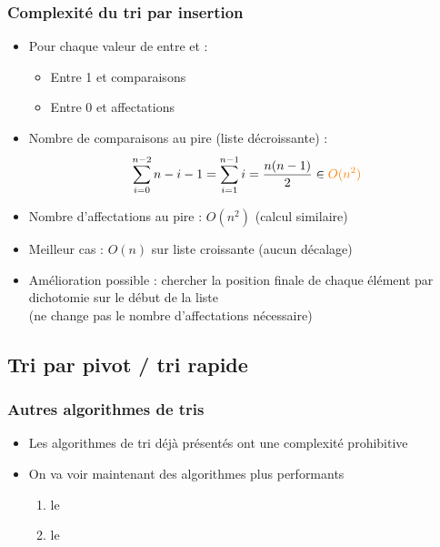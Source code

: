 \documentclass[12pt]{linfo-beamer}
\begin{document}
\begin{frame}
  \frametitle{Complexité du tri par insertion}

  \begin{itemize}
  \item Pour chaque valeur de  entre  et  :
    \begin{itemize}
    \item Entre 1 et  comparaisons
    \item Entre 0 et  affectations
    \end{itemize}
  \item Nombre de comparaisons au pire (liste décroissante) :
    \[
    \sum_{i=0}^{n-2} n-i-1 = \sum_{i=1}^{n-1} i = \frac{n(n-1)}{2} \in {\color{orange} O(n^2)}
    \]
  \item Nombre d'affectations au pire : $O(n^2)$ (calcul similaire)

  \item Meilleur cas : $O(n)$ sur liste croissante (aucun décalage)

  \item Amélioration possible : chercher la position finale de chaque
    élément par dichotomie sur le début de la liste\\
    (ne change pas le nombre d'affectations nécessaire)
  \end{itemize}
\end{frame}


\subsection{Tri par pivot / tri rapide}

\begin{frame}
    \frametitle{Autres algorithmes de tris}
\begin{itemize}
    \item Les algorithmes de tri déjà présentés ont une complexité prohibitive
    \item On va voir maintenant des algorithmes plus performants
    \begin{enumerate}
        \item le 
        \item le 
    \end{enumerate}
\end{itemize}
\end{frame}
\end{document}
